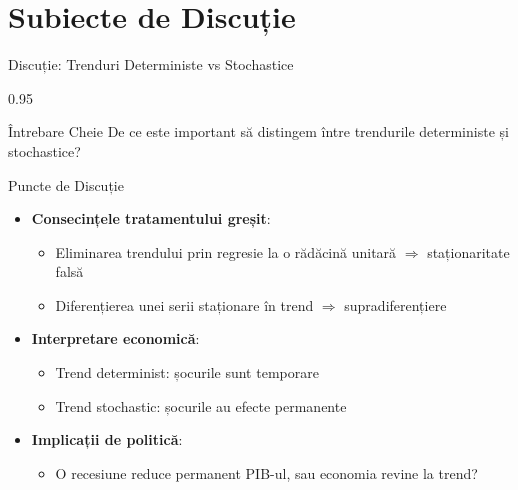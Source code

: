 \documentclass[9pt, aspectratio=169, t]{beamer}
\begin{document}
\section{Subiecte de Discuție}

\begin{frame}{Discuție: Trenduri Deterministe vs Stochastice}
    \begin{cminipage}{0.95\textwidth}
    \begin{block}{Întrebare Cheie}
        De ce este important să distingem între trendurile deterministe și stochastice?
    \end{block}

    \vspace{0.3cm}

    \begin{block}{Puncte de Discuție}
        \begin{itemize}\setlength{\itemsep}{0pt}
            \item \textbf{Consecințele tratamentului greșit}:
                \begin{itemize}\setlength{\itemsep}{0pt}
                    \item Eliminarea trendului prin regresie la o rădăcină unitară $\Rightarrow$ staționaritate falsă
                    \item Diferențierea unei serii staționare în trend $\Rightarrow$ supradiferențiere
                \end{itemize}
            \item \textbf{Interpretare economică}:
                \begin{itemize}\setlength{\itemsep}{0pt}
                    \item Trend determinist: șocurile sunt temporare
                    \item Trend stochastic: șocurile au efecte permanente
                \end{itemize}
            \item \textbf{Implicații de politică}:
                \begin{itemize}\setlength{\itemsep}{0pt}
                    \item O recesiune reduce permanent PIB-ul, sau economia revine la trend?
                \end{itemize}
        \end{itemize}
    \end{block}
    \end{cminipage}
\end{frame}
\end{document}
